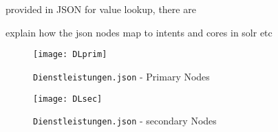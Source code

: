 

%

provided in JSON for value lookup, there are


explain how the json nodes map to intents and cores in solr etc


\begin{figure}[h!]
	\caption{\lstinline|Dienstleistungen.json|  - Primary Nodes}
	\texttt{[image: DLprim]}
\end{figure}

\begin{figure}[h]
	\caption{\lstinline|Dienstleistungen.json| - secondary Nodes}
	\texttt{[image: DLsec]}
\end{figure}

